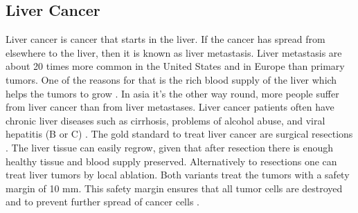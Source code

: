 \subsection{Liver Cancer}
Liver cancer is cancer that starts in the liver. If the cancer has spread from
elsewhere to the liver, then it is known as liver metastasis. Liver metastasis
are about 20 times more common in the United States and in Europe than primary tumors. One of the reasons for that
is the rich blood supply of the liver which helps the tumors to grow
\cite{mcguire2016world}. In asia it's the other way round, more people suffer
from liver cancer than from liver metastases. Liver cancer patients often have chronic liver diseases
such as cirrhosis, problems of alcohol abuse, and viral hepatitis (B or C)
\cite{galun2015hepatocellular}. The gold standard to treat liver cancer are
surgical resections \cite{lencioni2012local}. The liver tissue can easily regrow, given that after resection there is
enough healthy tissue and blood supply preserved. Alternatively to resections
one can treat liver tumors by local ablation. Both variants treat the tumors
with a safety margin of 10 mm. This safety margin ensures that all tumor cells
are destroyed and to prevent further spread of cancer cells \cite{mahnken2009ct}.
